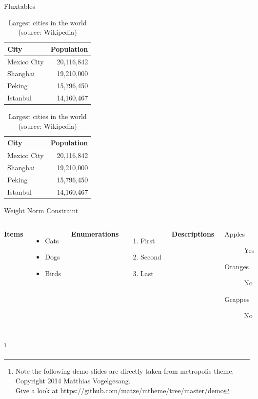 \documentclass[8pt, aspectratio=169]{beamer}
\begin{document}
\begin{frame}{Flux}{tables}
    \begin{table}
      \caption{Largest cities in the world (source: Wikipedia)}
      \begin{tabular}{@{} lr @{}}
        \toprule
        City & Population\\
        \midrule
        Mexico City & 20,116,842\\
        Shanghai & 19,210,000\\
        Peking & 15,796,450\\
        Istanbul & 14,160,467\\
        \bottomrule
      \end{tabular}
      \hspace*{1cm}
          \setlength\extrarowheight{3pt}
      \begin{tabular}{|lr|}
        \hline
        \rowcolor{primaryLight}\color{background}City & \color{background}Population\\
        \hline
        Mexico City & 20,116,842\\
        Shanghai & 19,210,000\\
        Peking & 15,796,450\\
        Istanbul & 14,160,467\\
        \hline
      \end{tabular}
  \end{table}
\end{frame}

\begin{frame}{Weight Norm Constraint}
  \begin{columns}[T,onlytextwidth]
      \textbf{Items}
      \begin{itemize}
        \item Cats \item Dogs \item Birds
      \end{itemize}

      \textbf{Enumerations}
      \begin{enumerate}
        \item First \item Second \item Last
      \end{enumerate}

      \textbf{Descriptions}
      \begin{description}
        \item[Apples] Yes \item[Oranges] No \item[Grappes] No
      \end{description}
  \end{columns}
  \let\thefootnote\relax\footnote{Note the following demo slides are directly taken from metropolis theme. Copyright 2014 Matthias Vogelgesang.\\
Give a look at https://github.com/matze/mtheme/tree/master/demo}
\end{frame}
\end{document}
